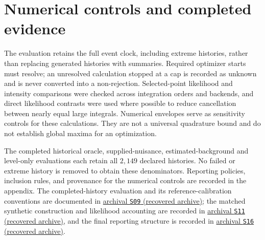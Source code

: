 \section{Numerical controls and completed evidence}

The evaluation retains the full event clock, including extreme histories, rather than replacing generated histories with summaries. Required optimizer starts must resolve; an unresolved calculation stopped at a cap is recorded as unknown and is never converted into a non-rejection. Selected-point likelihood and intensity comparisons were checked across integration orders and backends, and direct likelihood contrasts were used where possible to reduce cancellation between nearly equal large integrals. Numerical envelopes serve as sensitivity controls for these calculations. They are not a universal quadrature bound and do not establish global maxima for an optimization.

The completed historical oracle, supplied-nuisance, estimated-background and level-only evaluations each retain all \(2{,}149\) declared histories. No failed or extreme history is removed to obtain these denominators. Reporting policies, inclusion rules, and provenance for the numerical controls are recorded in the appendix. The completed-history evaluation and its reference-calibration conventions are documented in \hyperlink{S09}{archival \texttt{S09} (recovered archive)}; the matched synthetic construction and likelihood accounting are recorded in \hyperlink{S11}{archival \texttt{S11} (recovered archive)}, and the final reporting structure is recorded in \hyperlink{S16}{archival \texttt{S16} (recovered archive)}.

